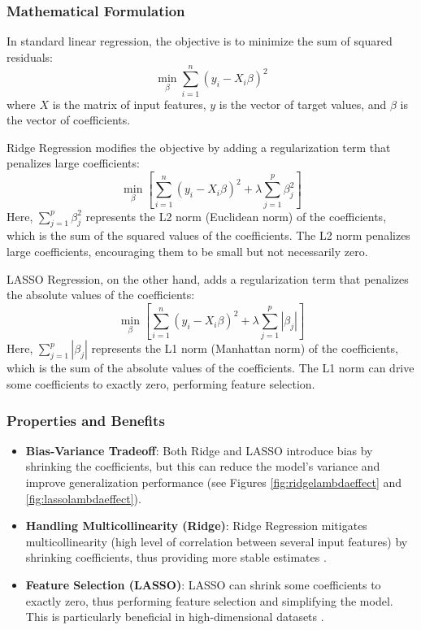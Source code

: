 \documentclass[english,11pt,a4paper,titlepage]{article}
\begin{document}
	\subsubsection*{Mathematical Formulation}
	In standard linear regression, the objective is to minimize the sum of squared residuals:
	\begin{equation} 
		\min_\beta \sum_{i=1}^{n}(y_i - X_i\beta)^2
	\end{equation}
	where $X$ is the matrix of input features, $y$ is the vector of target values, and $\beta$ is the vector of coefficients.
	
	Ridge Regression modifies the objective by adding a regularization term that penalizes large coefficients:
	\begin{equation}
		\min_\beta \left[\sum_{i=1}^{n}(y_i - X_i\beta)^2 + \lambda \sum_{j=1}^{p}\beta_{j}^{2}\right]
	\end{equation}
	Here, $\sum_{j=1}^{p}\beta_{j}^{2}$ represents the L2 norm (Euclidean norm) of the coefficients, which is the sum of the squared values of the coefficients. The L2 norm penalizes large coefficients, encouraging them to be small but not necessarily zero.
	
	LASSO Regression, on the other hand, adds a regularization term that penalizes the absolute values of the coefficients:
	\begin{equation}
		\min_\beta \left[\sum_{i=1}^{n}(y_i - X_i\beta)^2 + \lambda \sum_{j=1}^{p}|\beta_{j}|\right]
	\end{equation}
	Here, $\sum_{j=1}^{p}|\beta_{j}|$ represents the L1 norm (Manhattan norm) of the coefficients, which is the sum of the absolute values of the coefficients. The L1 norm can drive some coefficients to exactly zero, performing feature selection.
	
	\subsubsection*{Properties and Benefits}
	\begin{itemize}
		\item \textbf{Bias-Variance Tradeoff}: Both Ridge and LASSO introduce bias by shrinking the coefficients, but this can reduce the model's variance and improve generalization performance \cite{sohilIntroductionStatisticalLearning2022} (see Figures \ref{fig:ridgelambdaeffect} and \ref{fig:lassolambdaeffect}).
		\item \textbf{Handling Multicollinearity (Ridge)}: Ridge Regression mitigates multicollinearity (high level of correlation between several input features) by shrinking coefficients, thus providing more stable estimates \cite{hoerlRidgeRegressionBiased1970,marquardtRidgeRegressionPractice1975}.
		\item \textbf{Feature Selection (LASSO)}: LASSO can shrink some coefficients to exactly zero, thus performing feature selection and simplifying the model. This is particularly beneficial in high-dimensional datasets \cite{tibshiraniRegressionShrinkageSelection1996}.
	\end{itemize}
	
\end{document}
